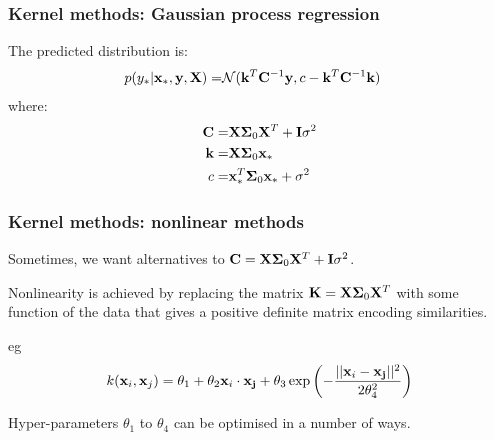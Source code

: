 \begin{frame}
\frametitle{Kernel methods: Gaussian process regression}
The predicted distribution is:
\begin{align*}
p(y_*|{\bf x}_*,{\bf y},{\bf X}) = &\mathcal{N}({\bf k}^T{\bf C}^{-1} {\bf y},c - {\bf k}^T {\bf C}^{-1} {\bf k})
\end{align*}
where:
\begin{align*}
{\bf C} = & {\bf X} \boldsymbol\Sigma_0 {\bf X}^T + {\bf I}\sigma^2\\
{\bf k} = & {\bf X} \boldsymbol\Sigma_0 {\bf x}_*\\
c = & {\bf x}_*^T \boldsymbol\Sigma_0 {\bf x}_* + \sigma^2
\end{align*}
\end{frame}

\begin{frame}
\frametitle{Kernel methods: nonlinear methods}
Sometimes, we want alternatives to ${\bf C} = {\bf X} \boldsymbol\Sigma_0 {\bf X}^T + {\bf I}\sigma^2$.\par
Nonlinearity is achieved by replacing the matrix ${\bf K} = {\bf X} \boldsymbol\Sigma_0 {\bf X}^T$ with some function of the data that gives a positive definite matrix encoding similarities.\par
eg
\begin{align*}
k({\bf x}_i,{\bf x}_j) = \theta_1 + \theta_2 {\bf x}_i \cdot {\bf x_j} + \theta_3 \exp\left(-\frac{||{\bf x}_i - {\bf x_j}||^2}{2 \theta_4^2}\right)
\end{align*}

Hyper-parameters $\theta_1$ to $\theta_4$ can be optimised in a number of ways.\par
\end{frame}

